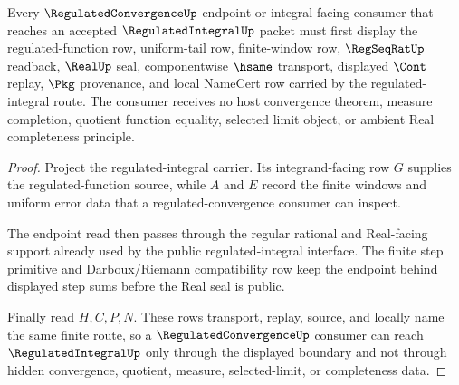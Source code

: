 \begin{theorem}
\label{thm:regulated-integral-convergence-consumer-boundary}
Every $\RegulatedConvergenceUp$ endpoint or integral-facing consumer that reaches an accepted $\RegulatedIntegralUp$ packet must first display the regulated-function row, uniform-tail row, finite-window row, $\RegSeqRatUp$ readback, $\RealUp$ seal, componentwise $\hsame$ transport, displayed $\Cont$ replay, $\Pkg$ provenance, and local NameCert row carried by the regulated-integral route. The consumer receives no host convergence theorem, measure completion, quotient function equality, selected limit object, or ambient Real completeness principle.
\end{theorem}
\begin{proof}
Project the regulated-integral carrier. Its integrand-facing row $G$ supplies the regulated-function source, while $A$ and $E$ record the finite windows and uniform error data that a regulated-convergence consumer can inspect.

The endpoint read then passes through the regular rational and Real-facing support already used by the public regulated-integral interface. The finite step primitive and Darboux/Riemann compatibility row keep the endpoint behind displayed step sums before the Real seal is public.

Finally read $H,C,P,N$. These rows transport, replay, source, and locally name the same finite route, so a $\RegulatedConvergenceUp$ consumer can reach $\RegulatedIntegralUp$ only through the displayed boundary and not through hidden convergence, quotient, measure, selected-limit, or completeness data.
\end{proof}

